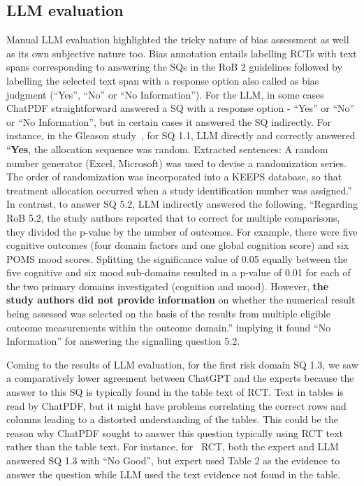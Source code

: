 \documentclass[sn-mathphys,Numbered]{sn-jnl}%
\theoremstyle{thmstyleone}%
\theoremstyle{thmstyletwo}%
\theoremstyle{thmstylethree}%
\begin{document}
\subsection{LLM evaluation}
\label{disc:llm}
%
Manual LLM evaluation highlighted the tricky nature of bias assessment as well as its own subjective nature too.
Bias annotation entails labelling RCTs with text spans corresponding to answering the SQs in the RoB 2 guidelines followed by labelling the selected text span with a response option also called as bias judgment (``Yes'', ``No'' or ``No Information'').
For the LLM, in some cases ChatPDF straightforward answered a SQ with a response option - ``Yes'' or ``No'' or ``No Information'', but in certain cases it answered the SQ indirectly.
For instance, in the Gleason study~\cite{gleason2015effects}, for SQ 1.1, LLM directly and correctly answered ``\textbf{Yes}, the allocation sequence was random. Extracted sentences: A random number generator (Excel, Microsoft) was used to devise a randomization series. The order of randomization was incorporated into a KEEPS database, so that treatment allocation occurred when a study identification number was assigned.''
In contrast, to answer SQ 5.2, LLM indirectly answered the following, ``Regarding RoB 5.2, the study authors reported that to correct for multiple comparisons, they divided the p-value by the number of outcomes. For example, there were five cognitive outcomes (four domain factors and one global cognition score) and six POMS mood scores. Splitting the significance value of 0.05 equally between the five cognitive and six mood sub-domains resulted in a p-value of 0.01 for each of the two primary domains investigated (cognition and mood). However, \textbf{the study authors did not provide information} on whether the numerical result being assessed was selected on the basis of the results from multiple eligible outcome measurements within the outcome domain.'' implying it found ``No Information'' for answering the signalling question 5.2.



Coming to the results of LLM evaluation, for the first risk domain SQ 1.3, we saw a comparatively lower agreement between ChatGPT and the experts because the answer to this SQ is typically found in the table text of RCT.
Text in tables is read by ChatPDF, but it might have problems correlating the correct rows and columns leading to a distorted understanding of the tables.
This could be the reason why ChatPDF sought to answer this question typically using RCT text rather than the table text.
For instance, for~\cite{stuck2015effect} RCT, both the expert and LLM answered SQ 1.3 with ``No Good'', but expert used Table 2 as the evidence to answer the question while LLM used the text evidence not found in the table.
\end{document}
